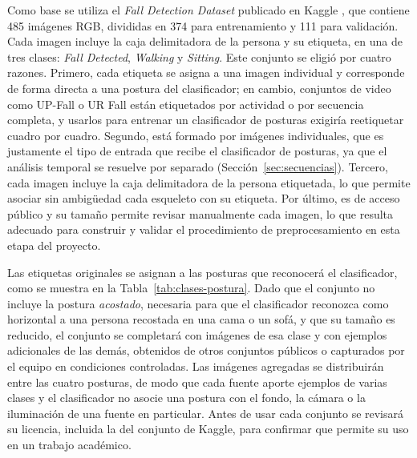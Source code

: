 \documentclass[12pt,a4paper,oneside]{book}
\theoremstyle{plain}
\theoremstyle{definition}
\theoremstyle{remark}
\begin{document}
Como base se utiliza el \textit{Fall Detection Dataset} publicado en Kaggle \parencite{kandagatla2022fall}, que contiene 485 imágenes RGB, divididas en 374 para entrenamiento y 111 para validación. Cada imagen incluye la caja delimitadora de la persona y su etiqueta, en una de tres clases: \textit{Fall Detected}, \textit{Walking} y \textit{Sitting}. Este conjunto se eligió por cuatro razones. Primero, cada etiqueta se asigna a una imagen individual y corresponde de forma directa a una postura del clasificador; en cambio, conjuntos de video como UP-Fall \parencite{martinez2019upfall} o UR Fall \parencite{kwolek2014human} están etiquetados por actividad o por secuencia completa, y usarlos para entrenar un clasificador de posturas exigiría reetiquetar cuadro por cuadro. Segundo, está formado por imágenes individuales, que es justamente el tipo de entrada que recibe el clasificador de posturas, ya que el análisis temporal se resuelve por separado (Sección~\ref{sec:secuencias}). Tercero, cada imagen incluye la caja delimitadora de la persona etiquetada, lo que permite asociar sin ambigüedad cada esqueleto con su etiqueta. Por último, es de acceso público y su tamaño permite revisar manualmente cada imagen, lo que resulta adecuado para construir y validar el procedimiento de preprocesamiento en esta etapa del proyecto.
 
Las etiquetas originales se asignan a las posturas que reconocerá el clasificador, como se muestra en la Tabla~\ref{tab:clases-postura}. Dado que el conjunto no incluye la postura \textit{acostado}, necesaria para que el clasificador reconozca como horizontal a una persona recostada en una cama o un sofá, y que su tamaño es reducido, el conjunto se completará con imágenes de esa clase y con ejemplos adicionales de las demás, obtenidos de otros conjuntos públicos o capturados por el equipo en condiciones controladas. Las imágenes agregadas se distribuirán entre las cuatro posturas, de modo que cada fuente aporte ejemplos de varias clases y el clasificador no asocie una postura con el fondo, la cámara o la iluminación de una fuente en particular. Antes de usar cada conjunto se revisará su licencia, incluida la del conjunto de Kaggle, para confirmar que permite su uso en un trabajo académico.
\end{document}
